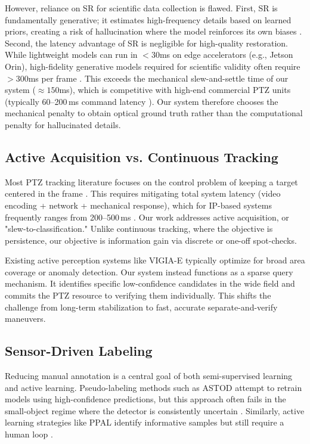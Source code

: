 \documentclass[conf]{new-aiaa}
\begin{document}
However, reliance on SR for scientific data collection is flawed. First, SR is fundamentally generative; it estimates high-frequency details based on learned priors, creating a risk of hallucination where the model reinforces its own biases \cite{zhang2019zoom}. Second, the latency advantage of SR is negligible for high-quality restoration. While lightweight models can run in $<30$ms on edge accelerators (e.g., Jetson Orin), high-fidelity generative models required for scientific validity often require $>300$ms per frame \cite{nvidia_jetson_benchmarks}. This exceeds the mechanical slew-and-settle time of our system ($\approx 150$ms), which is competitive with high-end commercial PTZ units (typically 60--200\,ms command latency \cite{ptz_latency_pelco}). Our system therefore chooses the mechanical penalty to obtain optical ground truth rather than the computational penalty for hallucinated details.

\subsection{Active Acquisition vs. Continuous Tracking}
Most PTZ tracking literature focuses on the control problem of keeping a target centered in the frame \cite{ptz_reproducible, ptz_eval}. This requires mitigating total system latency (video encoding + network + mechanical response), which for IP-based systems frequently ranges from 200--500\,ms \cite{ptz_latency_optics}. Our work addresses active acquisition, or "slew-to-classification." Unlike continuous tracking, where the objective is persistence, our objective is information gain via discrete or one-off spot-checks.

Existing active perception systems like VIGIA-E \cite{vigia_ptz} typically optimize for broad area coverage or anomaly detection. Our system instead functions as a sparse query mechanism. It identifies specific low-confidence candidates in the wide field and commits the PTZ resource to verifying them individually. This shifts the challenge from long-term stabilization to fast, accurate separate-and-verify maneuvers.

\subsection{Sensor-Driven Labeling}
Reducing manual annotation is a central goal of both semi-supervised learning and active learning. Pseudo-labeling methods such as ASTOD \cite{self_training} attempt to retrain models using high-confidence predictions, but this approach often fails in the small-object regime where the detector is consistently uncertain \cite{self_training_enh}. Similarly, active learning strategies like PPAL \cite{active_learning_ppod} identify informative samples but still require a human loop \cite{active_learning_survey}. 
\end{document}
